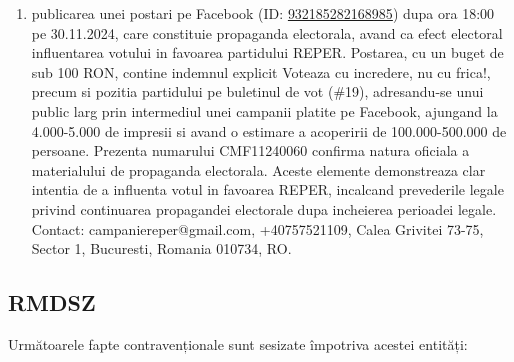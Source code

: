 \documentclass[a4paper,12pt]{article}
\begin{document}
\begin{enumerate}[leftmargin=*, label=\arabic*.)]
    \item publicarea unei postari pe Facebook (ID: \href{https://www.facebook.com/ads/library/?id=932185282168985}{932185282168985}) dupa ora 18:00 pe 30.11.2024, care constituie propaganda electorala, avand ca efect electoral influentarea votului in favoarea partidului REPER. Postarea, cu un buget de sub 100 RON,  contine indemnul explicit Voteaza cu incredere, nu cu frica!,  precum si pozitia partidului pe buletinul de vot (\#19),  adresandu-se unui public larg prin intermediul unei campanii platite pe Facebook,  ajungand la 4.000-5.000 de impresii si avand o estimare a acoperirii de 100.000-500.000 de persoane.  Prezenta numarului CMF11240060 confirma natura oficiala a materialului de propaganda electorala.  Aceste elemente demonstreaza clar intentia de a influenta votul in favoarea REPER, incalcand prevederile legale privind continuarea propagandei electorale dupa incheierea perioadei legale. Contact: campaniereper@gmail.com, +40757521109, Calea Grivitei 73-75, Sector 1, Bucuresti, Romania 010734, RO.
\end{enumerate}

\vspace{0.5cm}

\subsection{RMDSZ}
Următoarele fapte contravenționale sunt sesizate împotriva acestei entități:
\end{document}
